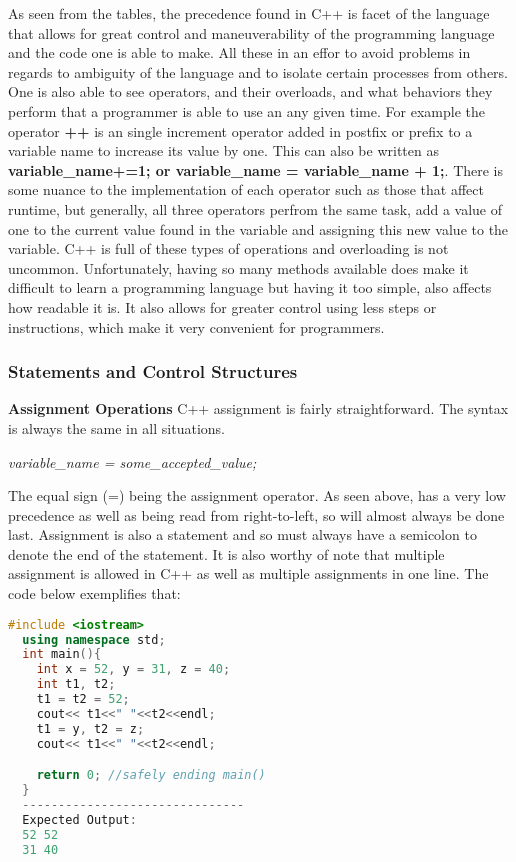 \documentclass[12pt]{article}
\begin{document}
As seen from the tables, the precedence found in C++ is facet of the language that allows for great control and maneuverability of the programming language and the code one is able to make. All these in an effor to avoid problems in regards to ambiguity of the language and to isolate certain processes from others. One is also able to see operators, and their overloads, and what behaviors they perform that a programmer is able to use an any given time. For example the operator \textbf{++} is an single increment operator added in postfix or prefix to a variable name to increase its value by one. This can also be written as \textbf{variable\_name+=1; or variable\_name = variable\_name + 1;}. There is some nuance to the implementation of each operator such as those that affect runtime, but generally, all three operators perfrom the same task, add a value of one to the current value found in the variable and assigning this new value to the variable. C++ is full of these types of operations and overloading is not uncommon. Unfortunately, having so many methods available does make it difficult to learn a programming language but having it too simple, also affects how readable it is. It also allows for greater control using less steps or instructions, which make it very convenient for programmers.

\subsubsection{Statements and Control Structures}

\textbf{Assignment Operations} C++ assignment is fairly straightforward. The syntax is always the same in all situations.
\begin{center}
  \textit{variable\_name = some\_accepted\_value;}
\end{center}
The equal sign (=) being the assignment operator. As seen above, has a very low precedence as well as being read from right-to-left, so will almost always be done last. Assignment is also a statement and so must always have a semicolon to denote the end of the statement. It is also worthy of note that multiple assignment is allowed in C++ as well as multiple assignments in one line. The code below exemplifies that:
\begin{lstlisting}[language=C++]
  #include <iostream>
  using namespace std;
  int main(){
    int x = 52, y = 31, z = 40;
    int t1, t2;
    t1 = t2 = 52;
    cout<< t1<<" "<<t2<<endl;
    t1 = y, t2 = z;
    cout<< t1<<" "<<t2<<endl;

    return 0; //safely ending main()
  }
  -------------------------------
  Expected Output:
  52 52
  31 40
\end{lstlisting}
\end{document}

